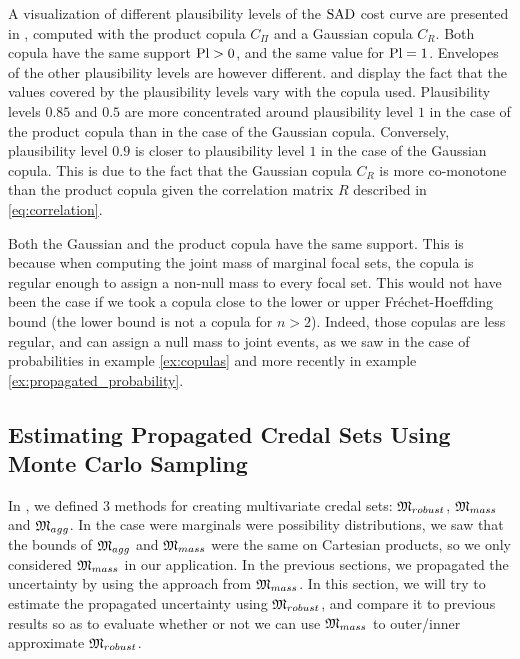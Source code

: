 A visualization of different plausibility levels of the $\mathrm{SAD}$ cost curve are presented in , computed with the product copula $C_\Pi$ and a Gaussian copula $C_R$. Both copula have the same support $\mathrm{Pl}>0$, and the same value for $\mathrm{Pl}=1$. Envelopes of the other plausibility levels are however different.  and  display the fact that the values covered by the plausibility levels vary with the copula used. Plausibility levels $0.85$ and $0.5$ are more concentrated around plausibility level $1$ in the case of the product copula than in the case of the Gaussian copula. Conversely, plausibility level $0.9$ is closer to plausibility level $1$ in the case of the Gaussian copula. This is due to the fact that the Gaussian copula $C_R$ is more co-monotone than the product copula given the correlation matrix $R$ described in \eqref{eq:correlation}.
\begin{remark}
    Both the Gaussian and the product copula have the same support. This is because when computing the joint mass of marginal focal sets, the copula is regular enough to assign a non-null mass to every focal set. This would not have been the case if we took a copula close to the lower or upper Fréchet-Hoeffding bound (the lower bound is not a copula for $n>2$). Indeed, those copulas are less regular, and can assign a null mass to joint events, as we saw in the case of probabilities in example \ref{ex:copulas} and more recently in example \ref{ex:propagated_probability}.
\end{remark}

\subsection{Estimating Propagated Credal Sets Using Monte Carlo Sampling}\label{sec:montecarlo}
In , we defined $3$ methods for creating multivariate credal sets: $\mathfrak{M}_{robust}$, $\mathfrak{M}_{mass}$ and $\mathfrak{M}_{agg}$. In the case were marginals were possibility distributions, we saw that the bounds of $\mathfrak{M}_{agg}$ and $\mathfrak{M}_{mass}$ were the same on Cartesian products, so we only considered $\mathfrak{M}_{mass}$ in our application. In the previous sections, we propagated the uncertainty by using the approach from $\mathfrak{M}_{mass}$. In this section, we will try to estimate the propagated uncertainty using $\mathfrak{M}_{robust}$, and compare it to previous results so as to evaluate whether or not we can use $\mathfrak{M}_{mass}$ to outer/inner approximate $\mathfrak{M}_{robust}$.

